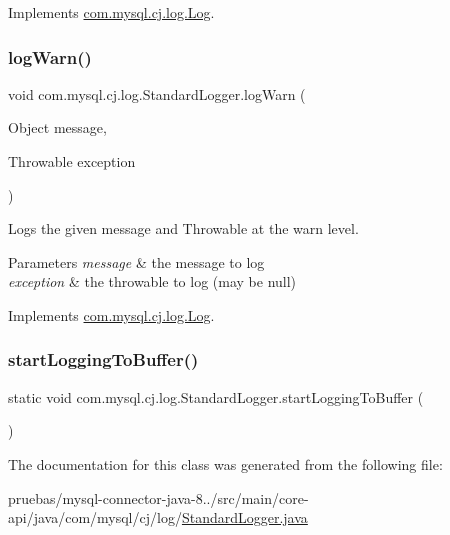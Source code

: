 Implements \mbox{\hyperlink{interfacecom_1_1mysql_1_1cj_1_1log_1_1_log_a3a30dcfb7f5790b79e9db64431107cfc}{com.\+mysql.\+cj.\+log.\+Log}}.

\mbox{\label{classcom_1_1mysql_1_1cj_1_1log_1_1_standard_logger_a3e05a95a97a95afb400144f652f43c78}} 
\subsubsection{\texorpdfstring{log\+Warn()}{logWarn()}\hspace{0.1cm}{\footnotesize\ttfamily [2/2]}}
{\footnotesize\ttfamily void com.\+mysql.\+cj.\+log.\+Standard\+Logger.\+log\+Warn (\begin{DoxyParamCaption}\item[{Object}]{message,  }\item[{Throwable}]{exception }\end{DoxyParamCaption})}

Logs the given message and Throwable at the \textquotesingle{}warn\textquotesingle{} level.


\begin{DoxyParams}{Parameters}
{\em message} & the message to log \\
\hline
{\em exception} & the throwable to log (may be null) \\
\hline
\end{DoxyParams}


Implements \mbox{\hyperlink{interfacecom_1_1mysql_1_1cj_1_1log_1_1_log_a36af866ddfdda47938c768d3d0e68572}{com.\+mysql.\+cj.\+log.\+Log}}.

\mbox{\label{classcom_1_1mysql_1_1cj_1_1log_1_1_standard_logger_a831ea7f31d1a979788a0018a1926bc7f}} 
\subsubsection{\texorpdfstring{start\+Logging\+To\+Buffer()}{startLoggingToBuffer()}}
{\footnotesize\ttfamily static void com.\+mysql.\+cj.\+log.\+Standard\+Logger.\+start\+Logging\+To\+Buffer (\begin{DoxyParamCaption}{ }\end{DoxyParamCaption})\hspace{0.3cm}{\ttfamily [static]}}



The documentation for this class was generated from the following file\+:\begin{DoxyCompactItemize}
\item 
pruebas/mysql-\/connector-\/java-\/8../src/main/core-\/api/java/com/mysql/cj/log/\mbox{\hyperlink{_standard_logger_8java}{Standard\+Logger.\+java}}\end{DoxyCompactItemize}
